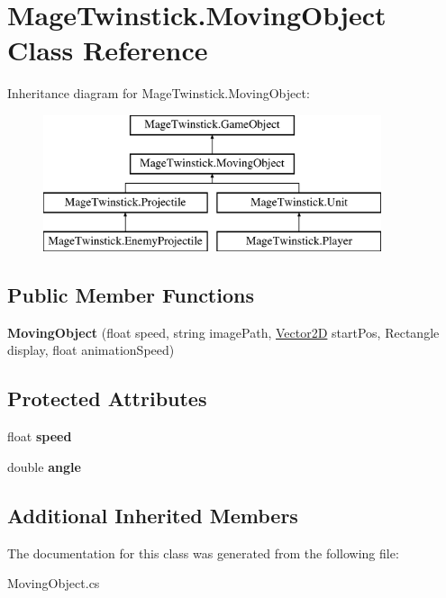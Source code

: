 \hypertarget{class_mage_twinstick_1_1_moving_object}{}\section{Mage\+Twinstick.\+Moving\+Object Class Reference}
\label{class_mage_twinstick_1_1_moving_object}
Inheritance diagram for Mage\+Twinstick.\+Moving\+Object\+:\begin{figure}[H]
\begin{center}
\leavevmode
\includegraphics[height=4.000000cm]{class_mage_twinstick_1_1_moving_object}
\end{center}
\end{figure}
\subsection*{Public Member Functions}
\begin{DoxyCompactItemize}
\item 
\hypertarget{class_mage_twinstick_1_1_moving_object_ab600a7d67a921669d7021f9c8b7b9891}{}{\bfseries Moving\+Object} (float speed, string image\+Path, \hyperlink{class_mage_twinstick_1_1_vector2_d}{Vector2\+D} start\+Pos, Rectangle display, float animation\+Speed)\label{class_mage_twinstick_1_1_moving_object_ab600a7d67a921669d7021f9c8b7b9891}

\end{DoxyCompactItemize}
\subsection*{Protected Attributes}
\begin{DoxyCompactItemize}
\item 
\hypertarget{class_mage_twinstick_1_1_moving_object_ac7f09bc1fd21342a3c68b1d25c7e209d}{}float {\bfseries speed}\label{class_mage_twinstick_1_1_moving_object_ac7f09bc1fd21342a3c68b1d25c7e209d}

\item 
\hypertarget{class_mage_twinstick_1_1_moving_object_a93fbd4b287c423a80a525f4e45b93279}{}double {\bfseries angle}\label{class_mage_twinstick_1_1_moving_object_a93fbd4b287c423a80a525f4e45b93279}

\end{DoxyCompactItemize}
\subsection*{Additional Inherited Members}


The documentation for this class was generated from the following file\+:\begin{DoxyCompactItemize}
\item 
Moving\+Object.\+cs\end{DoxyCompactItemize}
